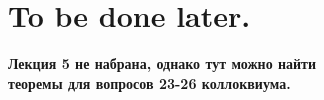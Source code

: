 \section{To be done later.}

\begin{center}
    \begin{LARGE}
        \textbf{
            Лекция 5 не набрана, однако тут можно найти \\
            теоремы для вопросов 23-26 коллоквиума.
        }
    \end{LARGE}
\end{center}

$  $

